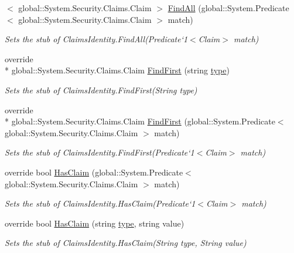 \begin{DoxyCompactItemize}
$<$ global\-::\-System.\-Security.\-Claims.\-Claim $>$ \hyperlink{class_system_1_1_security_1_1_claims_1_1_fakes_1_1_stub_claims_identity_a1b3775101961f8510f8090f6805ed8b4}{Find\-All} (global\-::\-System.\-Predicate$<$ global\-::\-System.\-Security.\-Claims.\-Claim $>$ match)
\begin{DoxyCompactList}\small\item\em Sets the stub of Claims\-Identity.\-Find\-All(Predicate`1$<$Claim$>$ match)\end{DoxyCompactList}\item 
override \\*
global\-::\-System.\-Security.\-Claims.\-Claim \hyperlink{class_system_1_1_security_1_1_claims_1_1_fakes_1_1_stub_claims_identity_add777eb652dfece187c98fa8fde35ba4}{Find\-First} (string \hyperlink{jquery-1_810_82-vsdoc_8js_a3940565e83a9bfd10d95ffd27536da91}{type})
\begin{DoxyCompactList}\small\item\em Sets the stub of Claims\-Identity.\-Find\-First(\-String type)\end{DoxyCompactList}\item 
override \\*
global\-::\-System.\-Security.\-Claims.\-Claim \hyperlink{class_system_1_1_security_1_1_claims_1_1_fakes_1_1_stub_claims_identity_a25e50db216548c4a4ed86181dc51f25f}{Find\-First} (global\-::\-System.\-Predicate$<$ global\-::\-System.\-Security.\-Claims.\-Claim $>$ match)
\begin{DoxyCompactList}\small\item\em Sets the stub of Claims\-Identity.\-Find\-First(Predicate`1$<$Claim$>$ match)\end{DoxyCompactList}\item 
override bool \hyperlink{class_system_1_1_security_1_1_claims_1_1_fakes_1_1_stub_claims_identity_a0cafbe5eb76fd6e66705d8ae0be84213}{Has\-Claim} (global\-::\-System.\-Predicate$<$ global\-::\-System.\-Security.\-Claims.\-Claim $>$ match)
\begin{DoxyCompactList}\small\item\em Sets the stub of Claims\-Identity.\-Has\-Claim(Predicate`1$<$Claim$>$ match)\end{DoxyCompactList}\item 
override bool \hyperlink{class_system_1_1_security_1_1_claims_1_1_fakes_1_1_stub_claims_identity_a36d5340d1feed7a092fc7c2cb0b418ce}{Has\-Claim} (string \hyperlink{jquery-1_810_82-vsdoc_8js_a3940565e83a9bfd10d95ffd27536da91}{type}, string value)
\begin{DoxyCompactList}\small\item\em Sets the stub of Claims\-Identity.\-Has\-Claim(\-String type, String value)\end{DoxyCompactList}\item 

\end{DoxyCompactItemize}
